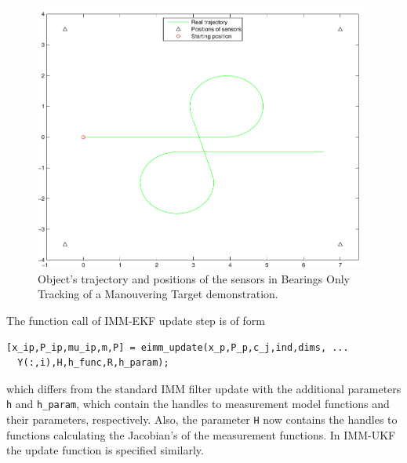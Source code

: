 \begin{figure}
\begin{center}
\includegraphics[width=11cm]{pics/eimm2_trajectory}
\caption{ Object's trajectory and positions of the sensors in Bearings
Only Tracking of a Manouvering Target demonstration.  }
\label{fig:eimm2_trajectory}
\end{center}
\end{figure}

The function call of IMM-EKF update step is of form
%
\begin{lstlisting} 
[x_ip,P_ip,mu_ip,m,P] = eimm_update(x_p,P_p,c_j,ind,dims, ...
  Y(:,i),H,h_func,R,h_param);
\end{lstlisting}
%
which differs from the standard IMM filter update with the additional
parameters \texttt{h} and \texttt{h\_param}, which contain the handles
to measurement model functions and their parameters,
respectively. Also, the parameter \texttt{H} now contains the handles
to functions calculating the Jacobian's of the measurement
functions. In IMM-UKF the update function is specified similarly.

